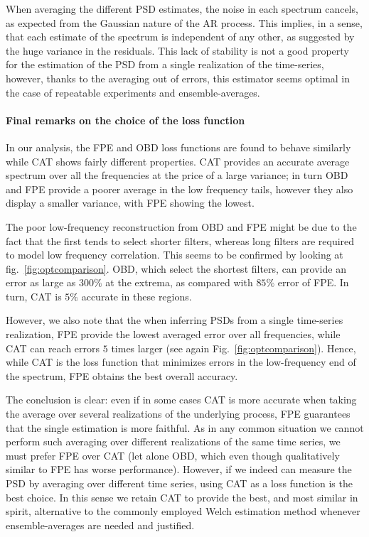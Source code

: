 \documentclass[twocolumn,showpacs,preprintnumbers,nofootinbib,prd,
superscriptaddress,10pt]{revtex4-1}
\begin{document}
When averaging the different PSD estimates, the noise in each spectrum cancels, as expected from the Gaussian nature of the AR process. 
This implies, in a sense, that each estimate of the spectrum is independent of any other, as suggested by the huge variance in the residuals. This lack of stability is not a good property for the estimation of the PSD from a single realization of the time-series, however, thanks to the averaging out of errors, this estimator seems optimal in the case of repeatable experiments and ensemble-averages.

\paragraph{Final remarks on the choice of the loss function}

In our analysis, the FPE and OBD loss functions are found to behave similarly while CAT shows fairly different properties.
CAT provides an accurate average spectrum over all the frequencies at the price of a large variance; in turn OBD and FPE 
provide a poorer average in the low frequency tails, however they also display a  smaller variance, with FPE showing the lowest.

The poor low-frequency reconstruction from OBD and FPE might be due to the fact that the first tends to select shorter filters, whereas long filters are required to model low frequency correlation.
This seems to be confirmed by looking at fig.~\ref{fig:optcomparison}. OBD, which select the shortest filters, can provide an error as large as $300 \%$ at the extrema, as compared with $85\%$ error of FPE. In turn, CAT is $5\%$ accurate in these regions.

However, we also note that the when inferring PSDs from a single time-series realization, FPE provide the lowest averaged error over all frequencies, while CAT can reach errors $5$ times larger (see again Fig.~\ref{fig:optcomparison}).
Hence, while CAT is the loss function that minimizes errors in the low-frequency end of the spectrum, FPE obtains the best overall accuracy. 

The conclusion is clear: even if in some cases CAT is more accurate when taking the average over several realizations of the underlying process, 
FPE guarantees that the single estimation is more faithful.
As in any common situation we cannot perform such averaging over different realizations of the same time series, we must prefer FPE over CAT (let alone OBD, which even though qualitatively similar to FPE has worse performance).
However, if we indeed can measure the PSD by averaging over different time series, using CAT as a loss function is the best choice. In this sense we retain CAT to provide the best, and most similar in spirit, alternative to the commonly employed Welch estimation method whenever ensemble-averages are needed and justified.
\end{document}
